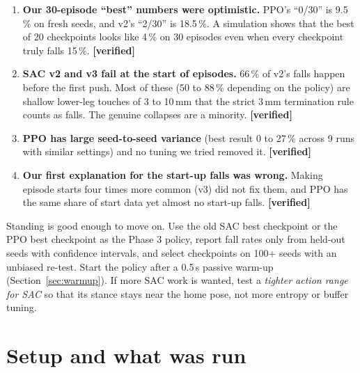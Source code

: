 \documentclass[11pt,a4paper]{article}
\newcommand{\tagv}{\textbf{[verified]}}
\begin{document}
\begin{badbox}[title={The main problems and what we found}]
\begin{enumerate}
\item \textbf{Our 30-episode ``best'' numbers were optimistic.} PPO's ``0/30'' is 9.5\,\% on fresh seeds, and v2's ``2/30'' is 18.5\,\%. A simulation shows that the best of 20 checkpoints looks like 4\,\% on 30 episodes even when every checkpoint truly falls 15\,\%. \tagv
\item \textbf{SAC v2 and v3 fail at the start of episodes.} 66\,\% of v2's falls happen before the first push. Most of these (50 to 88\,\% depending on the policy) are shallow lower-leg touches of 3 to 10\,mm that the strict 3\,mm termination rule counts as falls. The genuine collapses are a minority. \tagv
\item \textbf{PPO has large seed-to-seed variance} (best result 0 to 27\,\% across 9 runs with similar settings) and no tuning we tried removed it. \tagv
\item \textbf{Our first explanation for the start-up falls was wrong.} Making episode starts four times more common (v3) did not fix them, and PPO has the same share of start data yet almost no start-up falls. \tagv
\end{enumerate}
\end{badbox}

\begin{infobox}[title={Recommendation}]
Standing is good enough to move on. Use the old SAC best checkpoint or the PPO best checkpoint as the Phase 3 policy, report fall rates only from held-out seeds with confidence intervals, and select checkpoints on 100+ seeds with an unbiased re-test. Start the policy after a 0.5\,s passive warm-up (Section~\ref{sec:warmup}). If more SAC work is wanted, test a \emph{tighter action range for SAC} so that its stance stays near the home pose, not more entropy or buffer tuning.
\end{infobox}

\section{Setup and what was run}
\end{document}
